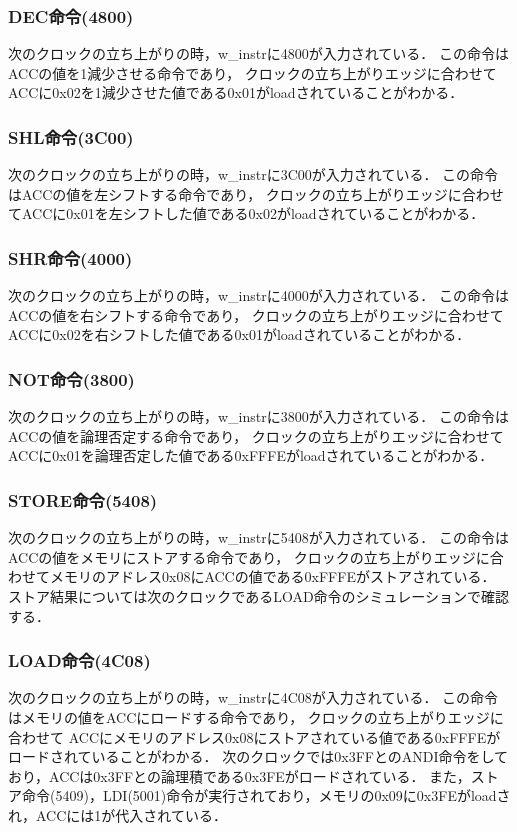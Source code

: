\documentclass[a4paper,11pt]{ltjsarticle}
\begin{document}
\subsubsection{DEC命令(4800)}
次のクロックの立ち上がりの時，w\_instrに4800が入力されている．
この命令はACCの値を1減少させる命令であり，
クロックの立ち上がりエッジに合わせてACCに0x02を1減少させた値である0x01がloadされていることがわかる．
\subsubsection{SHL命令(3C00)}
次のクロックの立ち上がりの時，w\_instrに3C00が入力されている．
この命令はACCの値を左シフトする命令であり，
クロックの立ち上がりエッジに合わせてACCに0x01を左シフトした値である0x02がloadされていることがわかる．
\subsubsection{SHR命令(4000)}
次のクロックの立ち上がりの時，w\_instrに4000が入力されている．
この命令はACCの値を右シフトする命令であり，
クロックの立ち上がりエッジに合わせてACCに0x02を右シフトした値である0x01がloadされていることがわかる．
\subsubsection{NOT命令(3800)}
次のクロックの立ち上がりの時，w\_instrに3800が入力されている．
この命令はACCの値を論理否定する命令であり，
クロックの立ち上がりエッジに合わせてACCに0x01を論理否定した値である0xFFFEがloadされていることがわかる．
\subsubsection{STORE命令(5408)}
次のクロックの立ち上がりの時，w\_instrに5408が入力されている．
この命令はACCの値をメモリにストアする命令であり，
クロックの立ち上がりエッジに合わせてメモリのアドレス0x08にACCの値である0xFFFEがストアされている．
ストア結果については次のクロックであるLOAD命令のシミュレーションで確認する．
\subsubsection{LOAD命令(4C08)}
次のクロックの立ち上がりの時，w\_instrに4C08が入力されている．
この命令はメモリの値をACCにロードする命令であり，
クロックの立ち上がりエッジに合わせて
ACCにメモリのアドレス0x08にストアされている値である0xFFFEがロードされていることがわかる．
次のクロックでは0x3FFとのANDI命令をしており，ACCは0x3FFとの論理積である0x3FEがロードされている．
また，ストア命令(5409)，LDI(5001)命令が実行されており，メモリの0x09に0x3FEがloadされ，ACCには1が代入されている．
\end{document}
